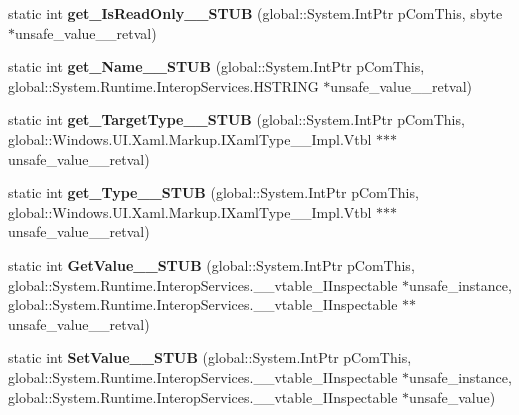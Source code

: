 \begin{DoxyCompactItemize}
static int {\bfseries get\+\_\+\+Is\+Read\+Only\+\_\+\+\_\+\+S\+T\+UB} (global\+::\+System.\+Int\+Ptr p\+Com\+This, sbyte $\ast$unsafe\+\_\+value\+\_\+\+\_\+retval)
\item 
\mbox{\label{struct_windows_1_1_u_i_1_1_xaml_1_1_markup_1_1_i_xaml_member_____impl_1_1_vtbl_a62fa2b1c4795a9faf836bcb5d053a965}} 
static int {\bfseries get\+\_\+\+Name\+\_\+\+\_\+\+S\+T\+UB} (global\+::\+System.\+Int\+Ptr p\+Com\+This, global\+::\+System.\+Runtime.\+Interop\+Services.\+H\+S\+T\+R\+I\+NG $\ast$unsafe\+\_\+value\+\_\+\+\_\+retval)
\item 
\mbox{\label{struct_windows_1_1_u_i_1_1_xaml_1_1_markup_1_1_i_xaml_member_____impl_1_1_vtbl_a5ca08627ab112151af93f8045a7e4d7f}} 
static int {\bfseries get\+\_\+\+Target\+Type\+\_\+\+\_\+\+S\+T\+UB} (global\+::\+System.\+Int\+Ptr p\+Com\+This, global\+::\+Windows.\+U\+I.\+Xaml.\+Markup.\+I\+Xaml\+Type\+\_\+\+\_\+\+Impl.\+Vtbl $\ast$$\ast$$\ast$unsafe\+\_\+value\+\_\+\+\_\+retval)
\item 
\mbox{\label{struct_windows_1_1_u_i_1_1_xaml_1_1_markup_1_1_i_xaml_member_____impl_1_1_vtbl_a1fe6ad1a5825b6a9bc1e12661eb240ac}} 
static int {\bfseries get\+\_\+\+Type\+\_\+\+\_\+\+S\+T\+UB} (global\+::\+System.\+Int\+Ptr p\+Com\+This, global\+::\+Windows.\+U\+I.\+Xaml.\+Markup.\+I\+Xaml\+Type\+\_\+\+\_\+\+Impl.\+Vtbl $\ast$$\ast$$\ast$unsafe\+\_\+value\+\_\+\+\_\+retval)
\item 
\mbox{\label{struct_windows_1_1_u_i_1_1_xaml_1_1_markup_1_1_i_xaml_member_____impl_1_1_vtbl_a701180ec993bf799ab85b05b4ac244e6}} 
static int {\bfseries Get\+Value\+\_\+\+\_\+\+S\+T\+UB} (global\+::\+System.\+Int\+Ptr p\+Com\+This, global\+::\+System.\+Runtime.\+Interop\+Services.\+\_\+\+\_\+vtable\+\_\+\+I\+Inspectable $\ast$unsafe\+\_\+instance, global\+::\+System.\+Runtime.\+Interop\+Services.\+\_\+\+\_\+vtable\+\_\+\+I\+Inspectable $\ast$$\ast$unsafe\+\_\+value\+\_\+\+\_\+retval)
\item 
\mbox{\label{struct_windows_1_1_u_i_1_1_xaml_1_1_markup_1_1_i_xaml_member_____impl_1_1_vtbl_ae54da9e1a9116b5083fcb8bf8405818f}} 
static int {\bfseries Set\+Value\+\_\+\+\_\+\+S\+T\+UB} (global\+::\+System.\+Int\+Ptr p\+Com\+This, global\+::\+System.\+Runtime.\+Interop\+Services.\+\_\+\+\_\+vtable\+\_\+\+I\+Inspectable $\ast$unsafe\+\_\+instance, global\+::\+System.\+Runtime.\+Interop\+Services.\+\_\+\+\_\+vtable\+\_\+\+I\+Inspectable $\ast$unsafe\+\_\+value)
\end{DoxyCompactItemize}
